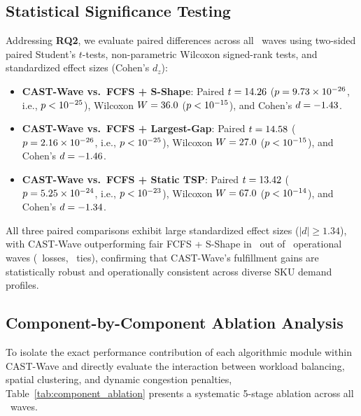 \documentclass[conference]{IEEEtran}
\begin{document}
\subsection{Statistical Significance Testing}
\label{sec:stats_sig}
Addressing \textbf{RQ2}, we evaluate paired differences across all \BenchmarkWaves~waves using two-sided paired Student's $t$-tests, non-parametric Wilcoxon signed-rank tests, and standardized effect sizes (Cohen's $d_z$):
\begin{itemize}
    \item \textbf{CAST-Wave vs.\ FCFS + S-Shape}: Paired $t = 14.26$ ($p = 9.73 \times 10^{-26}$, i.e., $p < 10^{-25}$), Wilcoxon $W = 36.0$ ($p < 10^{-15}$), and Cohen's $d = -1.43$.
    \item \textbf{CAST-Wave vs.\ FCFS + Largest-Gap}: Paired $t = 14.58$ ($p = 2.16 \times 10^{-26}$, i.e., $p < 10^{-25}$), Wilcoxon $W = 27.0$ ($p < 10^{-15}$), and Cohen's $d = -1.46$.
    \item \textbf{CAST-Wave vs.\ FCFS + Static TSP}: Paired $t = 13.42$ ($p = 5.25 \times 10^{-24}$, i.e., $p < 10^{-23}$), Wilcoxon $W = 67.0$ ($p < 10^{-14}$), and Cohen's $d = -1.34$.
\end{itemize}
All three paired comparisons exhibit large standardized effect sizes ($|d| \ge 1.34$), with CAST-Wave outperforming fair FCFS + S-Shape in \WinsVsSShape~out of \BenchmarkWaves~operational waves (\LossesVsSShape~losses, \TiesVsSShape~ties), confirming that CAST-Wave's fulfillment gains are statistically robust and operationally consistent across diverse SKU demand profiles.

\subsection{Component-by-Component Ablation Analysis}
\label{sec:comp_ablation}
To isolate the exact performance contribution of each algorithmic module within CAST-Wave and directly evaluate the interaction between workload balancing, spatial clustering, and dynamic congestion penalties, Table~\ref{tab:component_ablation} presents a systematic 5-stage ablation across all \BenchmarkWaves~waves.


\end{document}
